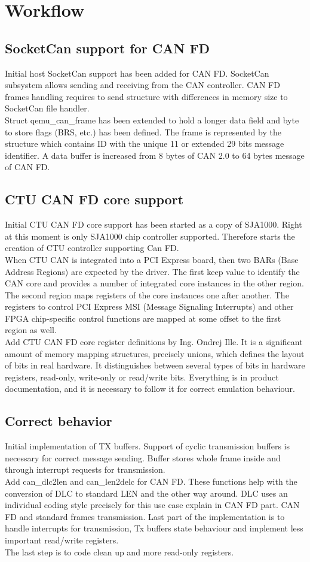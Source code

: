 \documentclass{ctuthesis}
\begin{document}
 
\chapter{Workflow}
 \section{SocketCan support for CAN FD}
 Initial host SocketCan support has been added for CAN FD. SocketCan subsystem allows sending and receiving from the CAN controller. CAN FD frames handling requires to send structure with differences in memory size to SocketCan file handler. \\
 Struct qemu\_can\_frame has been extended to hold a longer data field and byte to store flags (BRS, etc.) has been defined. The frame is represented by the structure which contains ID with the unique 11 or extended 29 bits message identifier. A data buffer is increased from 8 bytes of CAN 2.0 to 64 bytes message of CAN FD.
 \section{CTU CAN FD core support}
 Initial CTU CAN FD core support has been started as a copy of SJA1000. Right at this moment is only SJA1000 chip controller supported. Therefore starts the creation of CTU controller supporting Can FD. \\
 When CTU CAN is integrated into a PCI Express board, then two BARs (Base Address Regions) are expected by the driver. The first keep value to identify the CAN core and provides a number of integrated core instances in the other region. The second region maps registers of the core instances one after another. The registers to control PCI Express MSI (Message Signaling Interrupts) and other FPGA chip-specific control functions are mapped at some offset to the first region as well. \\ 
 Add CTU CAN FD core register definitions by Ing. Ondrej Ille. It is a significant amount of memory mapping structures, precisely unions, which defines the layout of bits in real hardware. It distinguishes between several types of bits in hardware registers, read-only, write-only or read/write bits. Everything is in product documentation, and it is necessary to follow it for correct emulation behaviour.
 \section{Correct behavior}
 Initial implementation of TX buffers. Support of cyclic transmission buffers is necessary for correct message sending. Buffer stores whole frame inside and through interrupt requests for transmission. \\
 Add can\_dlc2len and can\_len2delc for CAN FD. These functions help with the conversion of DLC to standard LEN and the other way around. DLC uses an individual coding style precisely for this use case explain in CAN FD part.
 CAN FD and standard frames transmission. Last part of the implementation is to handle interrupts for transmission, Tx buffers state behaviour and implement less important read/write registers. \\
 The last step is to code clean up and more read-only registers.
\end{document}
